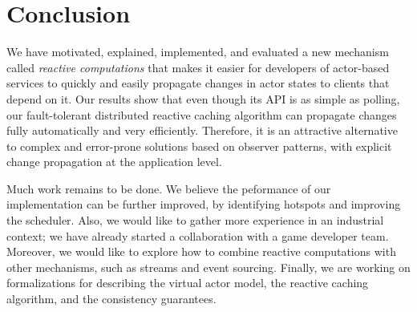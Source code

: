 \section{Conclusion}

We have motivated, explained, implemented, and evaluated a new mechanism called \emph{reactive computations} that makes it easier for developers of actor-based services to quickly and easily propagate changes in actor states to clients that depend on it. Our results show that even though its API is as simple as polling, our fault-tolerant distributed reactive caching algorithm can propagate changes fully automatically and very efficiently. Therefore, it is an attractive alternative to complex and error-prone solutions based on observer patterns, with explicit change propagation at the application level.

Much work remains to be done. We believe the peformance of our implementation can be further improved, by identifying hotspots and improving the scheduler. Also, we would like to gather more experience in an industrial context; we have already started a collaboration with a game developer team. Moreover, we would like to explore how to combine reactive computations with other mechanisms, such as streams and event sourcing. Finally, we are working on formalizations for describing the virtual actor model, the reactive caching algorithm, and the consistency guarantees.